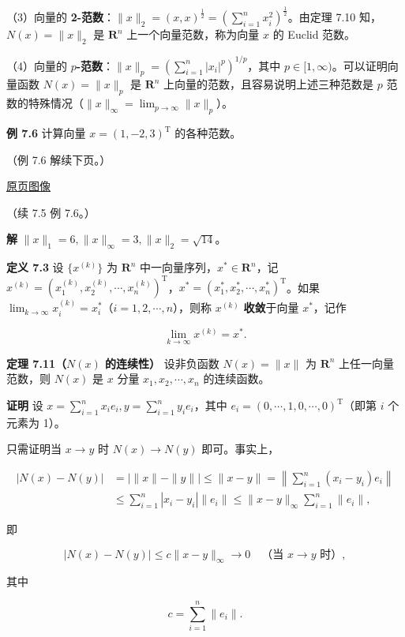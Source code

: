 \documentclass[
  10pt,
  fontset=fandol]{ctexart}
\begin{document}
（3）向量的 \textbf{2-范数}：\(\|x\|_2=(x,x)^{\frac12}=\left(\sum_{i=1}^{n}x_i^2\right)^{\frac12}\)。由定理 7.10 知，\(N(x)=\|x\|_2\) 是 \(\mathbf R^n\) 上一个向量范数，称为向量 \(x\) 的 Euclid 范数。

（4）向量的 \textbf{\(p\)-范数}：\(\|x\|_p=\left(\sum_{i=1}^{n}|x_i|^p\right)^{1/p}\)，其中 \(p\in[1,\infty)\)。可以证明向量函数 \(N(x)=\|x\|_p\) 是 \(\mathbf R^n\) 上向量的范数，且容易说明上述三种范数是 \(p\) 范数的特殊情况（\(\|x\|_\infty=\lim_{p\to\infty}\|x\|_p\)）。

\textbf{例 7.6} 计算向量 \(x=(1,-2,3)^{\mathrm T}\) 的各种范数。

（例 7.6 解续下页。）

\href{../../source-images/pdf-201.jpeg}{原页图像}

（续 7.5 例 7.6。）

\textbf{解} \(\|x\|_1=6,\|x\|_\infty=3,\|x\|_2=\sqrt{14}\)。

\textbf{定义 7.3} 设 \(\{x^{(k)}\}\) 为 \(\mathbf R^n\) 中一向量序列，\(x^*\in\mathbf R^n\)，记 \(x^{(k)}=(x_1^{(k)},x_2^{(k)},\cdots,x_n^{(k)})^{\mathrm T}\)，\(x^*=(x_1^*,x_2^*,\cdots,x_n^*)^{\mathrm T}\)。如果 \(\lim_{k\to\infty}x_i^{(k)}=x_i^*\)（\(i=1,2,\cdots,n\)），则称 \(x^{(k)}\) \textbf{收敛}于向量 \(x^*\)，记作

\[
\lim_{k\to\infty}x^{(k)}=x^*.
\]

\textbf{定理 7.11（\(N(x)\) 的连续性）} 设非负函数 \(N(x)=\|x\|\) 为 \(\mathbf R^n\) 上任一向量范数，则 \(N(x)\) 是 \(x\) 分量 \(x_1,x_2,\cdots,x_n\) 的连续函数。

\textbf{证明} 设 \(x=\sum_{i=1}^{n}x_ie_i,y=\sum_{i=1}^{n}y_ie_i\)，其中 \(e_i=(0,\allowbreak \cdots,\allowbreak 1,\allowbreak 0,\allowbreak \cdots,\allowbreak 0)^{\mathrm T}\)（即第 \(i\) 个元素为 1）。

只需证明当 \(x\to y\) 时 \(N(x)\to N(y)\) 即可。事实上，

\[
\begin{aligned}
|N(x)-N(y)|
&=\big|\|x\|-\|y\|\big|\leqslant\|x-y\|
=\left\|\sum_{i=1}^{n}(x_i-y_i)e_i\right\|\\
&\leqslant\sum_{i=1}^{n}|x_i-y_i|\|e_i\|
\leqslant\|x-y\|_\infty\sum_{i=1}^{n}\|e_i\|,
\end{aligned}
\]

即

\[
|N(x)-N(y)|\leqslant c\|x-y\|_\infty\to0\quad\text{（当 }x\to y\text{ 时）},
\]

其中

\[
c=\sum_{i=1}^{n}\|e_i\|.
\]
\end{document}
